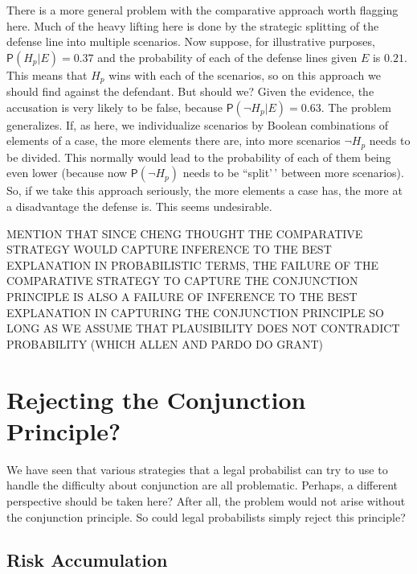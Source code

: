 \documentclass[
  10pt,
  dvipsnames,enabledeprecatedfontcommands]{scrartcl}
\newcommand{\n}{\neg}
\newcommand{\pr}[1]{\mathsf{P}(#1)}
\begin{document}
There is a more general problem with the comparative approach worth
flagging here. Much of the heavy lifting here is done by the strategic
splitting of the defense line into multiple scenarios. Now suppose, for
illustrative purposes, \(\pr{H_p\vert E}=0.37\) and the probability of
each of the defense lines given \(E\) is \(0.21\). This means that
\(H_p\) wins with each of the scenarios, so on this approach we should
find against the defendant. But should we? Given the evidence, the
accusation is very likely to be false, because
\(\pr{\n H_p \vert E}=0.63\). The problem generalizes. If, as here, we
individualize scenarios by Boolean combinations of elements of a case,
the more elements there are, into more scenarios \(\n H_p\) needs to be
divided. This normally would lead to the probability of each of them
being even lower (because now \(\pr{\n H_p}\) needs to be ``split'\,'
between more scenarios). So, if we take this approach seriously, the
more elements a case has, the more at a disadvantage the defense is.
This seems undesirable.

MENTION THAT SINCE CHENG THOUGHT THE COMPARATIVE STRATEGY WOULD CAPTURE
INFERENCE TO THE BEST EXPLANATION IN PROBABILISTIC TERMS, THE FAILURE OF
THE COMPARATIVE STRATEGY TO CAPTURE THE CONJUNCTION PRINCIPLE IS ALSO A
FAILURE OF INFERENCE TO THE BEST EXPLANATION IN CAPTURING THE
CONJUNCTION PRINCIPLE SO LONG AS WE ASSUME THAT PLAUSIBILITY DOES NOT
CONTRADICT PROBABILITY (WHICH ALLEN AND PARDO DO GRANT)

\hypertarget{rejecting-the-conjunction-principle}{%
\section{Rejecting the Conjunction
Principle?}\label{rejecting-the-conjunction-principle}}

We have seen that various strategies that a legal probabilist can try to
use to handle the difficulty about conjunction are all problematic.
Perhaps, a different perspective should be taken here? After all, the
problem would not arise without the conjunction principle. So could
legal probabilists simply reject this principle?

\hypertarget{risk-accumulation}{%
\subsection{Risk Accumulation}\label{risk-accumulation}}
\end{document}
